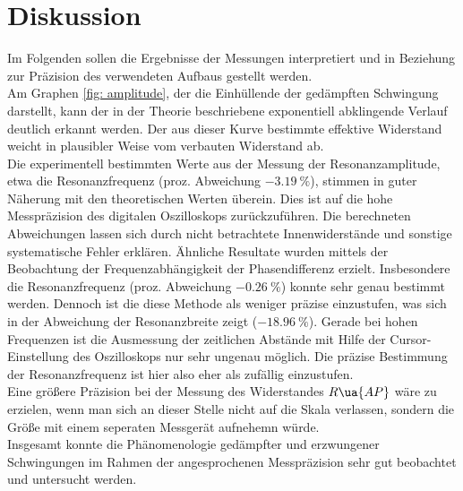 \section{Diskussion}
Im Folgenden sollen die Ergebnisse der Messungen interpretiert und in Beziehung zur Präzision des verwendeten Aufbaus gestellt werden. \\
Am Graphen \ref{fig: amplitude}, der die Einhüllende der gedämpften Schwingung darstellt, kann der in der Theorie beschriebene exponentiell abklingende
Verlauf deutlich erkannt werden. Der aus dieser Kurve bestimmte effektive Widerstand weicht in plausibler Weise vom verbauten Widerstand ab.\\
Die experimentell bestimmten Werte aus der Messung der Resonanzamplitude, etwa die Resonanzfrequenz (proz. Abweichung $\SI{-3.19}{\percent}$),
stimmen in guter Näherung mit den theoretischen Werten überein. Dies ist auf die hohe Messpräzision des digitalen Oszilloskops zurückzuführen.
Die berechneten Abweichungen lassen sich durch nicht betrachtete Innenwiderstände und sonstige systematische Fehler erklären. Ähnliche Resultate
wurden mittels der Beobachtung der Frequenzabhängigkeit der Phasendifferenz erzielt. Insbesondere die Resonanzfrequenz (proz. Abweichung $\SI{-0.26}{\percent}$) konnte
sehr genau bestimmt werden. Dennoch ist die diese Methode als weniger präzise einzustufen, was sich in der Abweichung der Resonanzbreite
zeigt ($\SI{-18.96}{\percent}$). Gerade bei hohen Frequenzen ist die Ausmessung der zeitlichen Abstände mit Hilfe der Cursor-Einstellung des Oszilloskops
nur sehr ungenau möglich. Die präzise Bestimmung der Resonanzfrequenz ist hier also eher als zufällig einzustufen. \\
Eine größere Präzision bei der Messung des Widerstandes $R\ua{AP}$ wäre zu erzielen, wenn man sich an dieser Stelle nicht auf die Skala verlassen, sondern
die Größe mit einem seperaten Messgerät aufnehemn würde.\\
Insgesamt konnte die Phänomenologie gedämpfter und erzwungener Schwingungen im Rahmen der angesprochenen Messpräzision sehr gut beobachtet und untersucht werden.
